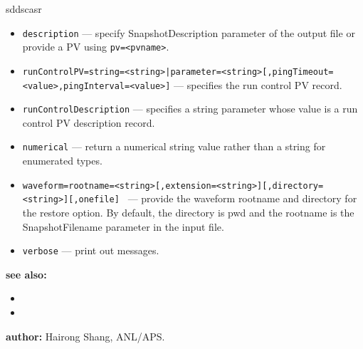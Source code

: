 \begin{sddsprog}{sddscasr}
\begin{itemize}
  \item {\tt description} --- specify SnapshotDescription parameter of the output file or provide a PV using {\tt pv=<pvname>}.
  \item {\tt runControlPV=string=<string>|parameter=<string>[,pingTimeout=<value>,pingInterval=<value>]} --- specifies the run control PV record.
  \item {\tt runControlDescription} --- specifies a string parameter whose value is a run control PV description record.
  \item {\tt numerical} --- return a numerical string value rather than a string for enumerated types.
  \item {\tt waveform=rootname=<string>[,extension=<string>][,directory=<string>][,onefile] \newline
      [,saveWaveformFile][,fullname]} --- provide the waveform rootname and directory for the restore option. By default, the directory is pwd and the rootname is the SnapshotFilename parameter in the input file.
  \item {\tt verbose} --- print out messages.
\end{itemize}

\item \textbf{see also:}
\begin{itemize}
  \item {}
  \item {}
\end{itemize}
\item \textbf{author:} Hairong Shang, ANL/APS.
\end{sddsprog}
